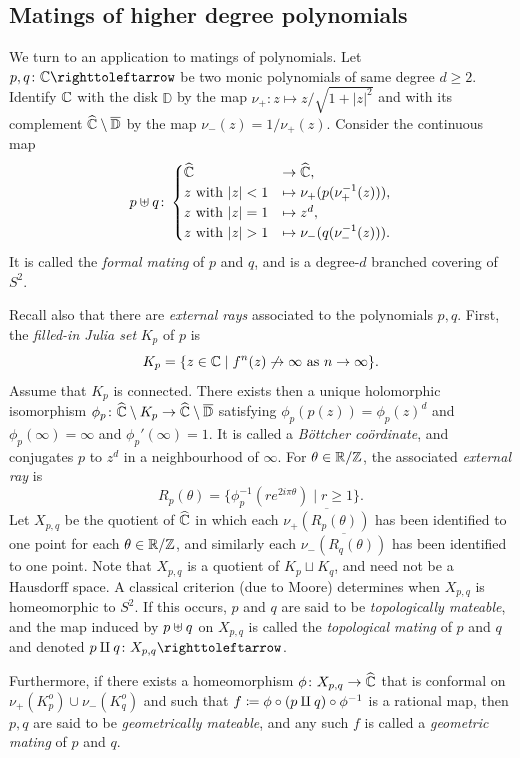\documentclass{amsart}
\begin{document}
\subsection{Matings of higher degree polynomials}\label{ss:matings}
We turn to an application to matings of polynomials. Let
$p,q\colon\C\selfmap$ be two monic polynomials of same degree
$d\ge2$. Identify ${\mathbb C}$ with the disk $\mathbb D$ by the map
$\nu_+\colon z\mapsto z/\sqrt{1+|z|^2}$ and with its complement
${\widehat{{\mathbb C}}}\setminus\overline{\mathbb D}$ by the map
$\nu_-(z)=1/\nu_+(z)$. Consider the continuous map
\[p\FM q\colon\begin{cases}\hC & \to\hC,\\
  z\text{ with }|z|<1 & \mapsto \nu_+(p(\nu_+^{-1}(z))),\\
  z\text{ with }|z|=1 & \mapsto z^d,\\
  z\text{ with }|z|>1 & \mapsto \nu_-(q(\nu_-^{-1}(z))).
\end{cases}\]
It is called the \emph{formal mating} of $p$ and $q$, and is a
degree-$d$ branched covering of $S^2$.

Recall also that there are \emph{external rays} associated to the
polynomials $p,q$. First, the \emph{filled-in Julia set} $K_p$ of $p$ is
\[K_p=\{z\in{\mathbb C}\mid f^n(z)\not\to\infty\text{ as }n\to\infty\}.\]
Assume that $K_p$ is connected. There exists then a unique holomorphic
isomorphism
$\phi_p\colon{\widehat{{\mathbb C}}}\setminus K_p\to{\widehat{{\mathbb C}}}\setminus\overline{\mathbb D}$
satisfying $\phi_p(p(z))=\phi_p(z)^d$ and $\phi_p(\infty)=\infty$ and
$\phi_p'(\infty)=1$. It is called a \emph{B\"ottcher co\"ordinate}, and
conjugates $p$ to $z^d$ in a neighbourhood of $\infty$. For
$\theta\in{\mathbb R}/{\mathbb Z}$, the associated \emph{external ray} is
\[R_p(\theta)=\{\phi_p^{-1}(re^{2i\pi\theta})\mid r\ge1\}.\] Let $X_{p,q}$
be the quotient of ${\widehat{{\mathbb C}}}$ in which each $\overline{\nu_+(R_p(\theta))}$ has
been identified to one point for each $\theta\in{\mathbb R}/{\mathbb Z}$, and similarly each
$\overline{\nu_-(R_q(\theta))}$ has been identified to one point. Note that
$X_{p,q}$ is a quotient of $K_p\sqcup K_q$, and need not be a Hausdorff
space. A classical criterion (due to Moore) determines when $X_{p,q}$ is
homeomorphic to $S^2$. If this occurs, $p$ and $q$ are said to be
\emph{topologically mateable}, and the map induced by $p\uplus q$ on $X_{p,q}$
is called the \emph{topological mating} of $p$ and $q$ and denoted $p\GM
q\colon X_{p,q}\selfmap$.

Furthermore, if there exists a homeomorphism
$\phi\colon X_{p,q}\to{\widehat{{\mathbb C}}}$ that is conformal on
$\nu_+(K_p^o)\cup\nu_-(K_q^o)$ and such that
$f\coloneqq\phi\circ(p\amalg q)\circ\phi^{-1}$ is a rational map, then
$p,q$ are said to be \emph{geometrically mateable}, and any such $f$
is called a \emph{geometric mating} of $p$ and $q$.
\end{document}
